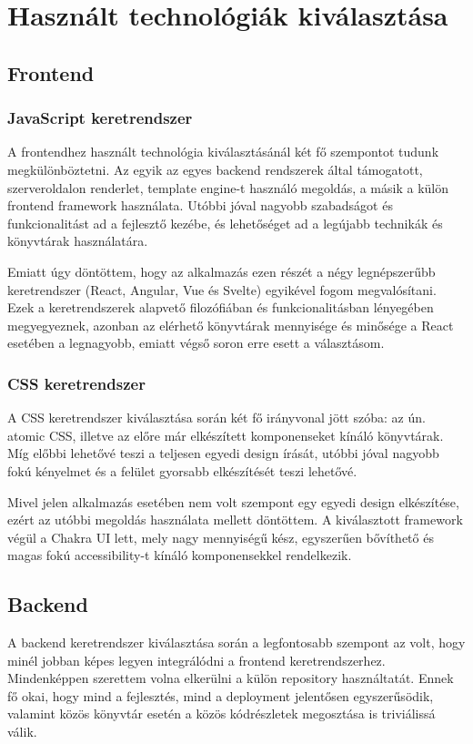 \chapter{Használt technológiák kiválasztása}

\section{Frontend}
\subsection{JavaScript keretrendszer}
A frontendhez használt technológia kiválasztásánál két fő szempontot tudunk megkülönböztetni.
Az egyik az egyes backend rendszerek által támogatott, szerveroldalon renderlet, template engine-t használó megoldás, a másik a külön frontend framework használata.
Utóbbi jóval nagyobb szabadságot és funkcionalitást ad a fejlesztő kezébe, és lehetőséget ad a legújabb technikák és könyvtárak használatára.

Emiatt úgy döntöttem, hogy az alkalmazás ezen részét a négy legnépszerűbb keretrendszer (React, Angular, Vue és Svelte) egyikével fogom megvalósítani.
Ezek a keretrendszerek alapvető filozófiában és funkcionalitásban lényegében megyegyeznek, azonban az elérhető könyvtárak mennyisége és minősége a React esetében a legnagyobb, emiatt végső soron erre esett a választásom.

\subsection{CSS keretrendszer}
A CSS keretrendszer kiválasztása során két fő irányvonal jött szóba: az ún. atomic CSS, illetve az előre már elkészített komponenseket kínáló könyvtárak.
Míg előbbi lehetővé teszi a teljesen egyedi design írását, utóbbi jóval nagyobb fokú kényelmet és a felület gyorsabb elkészítését teszi lehetővé.

Mivel jelen alkalmazás esetében nem volt szempont egy egyedi design elkészítése, ezért az utóbbi megoldás használata mellett döntöttem.
A kiválasztott framework végül a Chakra UI lett, mely nagy mennyiségű kész, egyszerűen bővíthető és magas fokú accessibility-t kínáló komponensekkel rendelkezik.

\section{Backend}
A backend keretrendszer kiválasztása során a legfontosabb szempont az volt, hogy minél jobban képes legyen integrálódni a frontend keretrendszerhez.
Mindenképpen szerettem volna elkerülni a külön repository használtatát.
Ennek fő okai, hogy mind a fejlesztés, mind a deployment jelentősen egyszerűsödik, valamint közös könyvtár esetén a közös kódrészletek megosztása is triviálissá válik.

